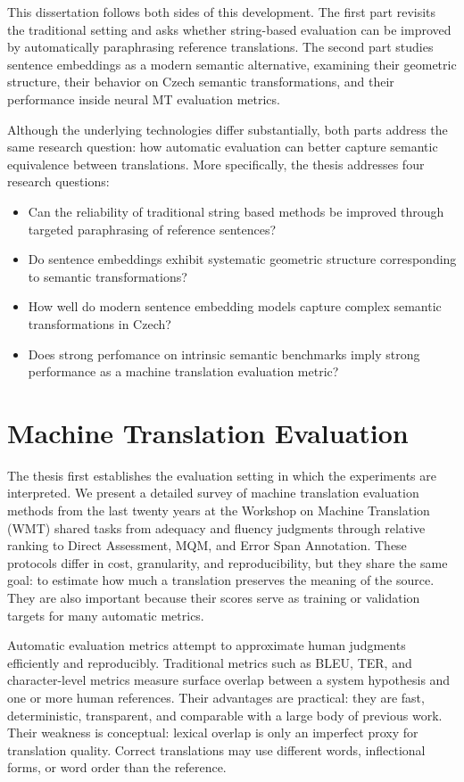 \documentclass[12pt,a4paper]{report}
\newcommand{\bleu}{\textsc{BLEU}\xspace}
\newcommand{\ter}{\textsc{TER}\xspace}
\begin{document}
This dissertation follows both sides of this development. The first part revisits the 
traditional setting and asks whether string-based evaluation can be improved by 
automatically paraphrasing reference translations. The second part studies sentence 
embeddings as a modern semantic alternative, examining their geometric structure, their 
behavior on Czech semantic transformations, and their performance inside neural MT 
evaluation metrics.

Although the underlying technologies differ substantially, both parts address the same 
research question:  how automatic evaluation can better capture semantic equivalence 
between translations. More specifically, the thesis addresses four research questions: 

\begin{itemize}
\item Can the reliability of traditional string based methods be improved through 
      targeted paraphrasing of reference sentences?
\item Do sentence embeddings exhibit systematic geometric structure corresponding to semantic transformations?
\item How well do modern sentence embedding models capture complex semantic transformations in Czech?
\item Does strong perfomance on intrinsic semantic benchmarks imply strong performance as
       a machine translation evaluation metric?
\end{itemize}

\chapter{Machine Translation Evaluation}

The thesis first establishes the evaluation setting in which the experiments are interpreted. 
We present a detailed survey of machine translation evaluation methods from the last twenty 
years at the Workshop on Machine Translation (WMT) shared tasks from adequacy and fluency 
judgments through relative ranking to Direct Assessment, MQM, and Error Span Annotation.
These protocols differ in cost, granularity, and reproducibility, but they share the same 
goal: to estimate how much a translation preserves the meaning of the source. They are also 
important because their scores serve as training or validation targets for many automatic metrics. 

Automatic evaluation metrics attempt to approximate human judgments efficiently and reproducibly. 
Traditional metrics such as \bleu \citep{papineni-etal-2002-bleu}, \ter, and character-level 
metrics measure surface overlap between a system hypothesis and one or more human references. 
Their advantages are practical: they are fast, deterministic, transparent, and comparable with 
a large body of previous work. Their weakness is conceptual: lexical overlap is only an imperfect 
proxy for translation quality. Correct translations may use different words, inflectional forms, 
or word order than the reference.
\end{document}
